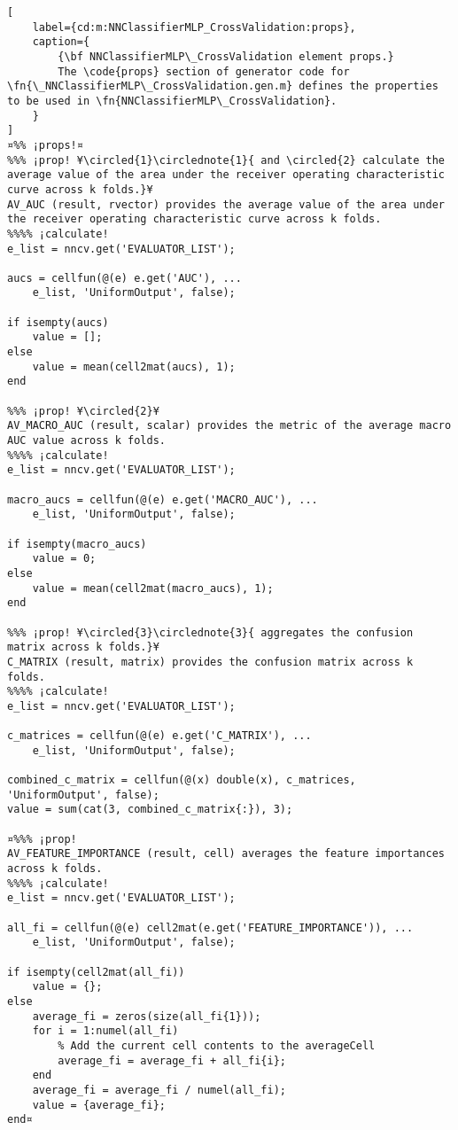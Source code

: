 \documentclass{tufte-handout}
\begin{document}
\begin{lstlisting}[
	label={cd:m:NNClassifierMLP_CrossValidation:props},
	caption={
		{\bf NNClassifierMLP\_CrossValidation element props.}
		The \code{props} section of generator code for \fn{\_NNClassifierMLP\_CrossValidation.gen.m} defines the properties to be used in \fn{NNClassifierMLP\_CrossValidation}.
	}
]
¤%% ¡props!¤
%%% ¡prop! ¥\circled{1}\circlednote{1}{ and \circled{2} calculate the average value of the area under the receiver operating characteristic curve across k folds.}¥
AV_AUC (result, rvector) provides the average value of the area under the receiver operating characteristic curve across k folds.
%%%% ¡calculate!
e_list = nncv.get('EVALUATOR_LIST');

aucs = cellfun(@(e) e.get('AUC'), ...
    e_list, 'UniformOutput', false);

if isempty(aucs)
    value = [];
else
    value = mean(cell2mat(aucs), 1);
end

%%% ¡prop! ¥\circled{2}¥
AV_MACRO_AUC (result, scalar) provides the metric of the average macro AUC value across k folds.
%%%% ¡calculate!
e_list = nncv.get('EVALUATOR_LIST');

macro_aucs = cellfun(@(e) e.get('MACRO_AUC'), ...
    e_list, 'UniformOutput', false);

if isempty(macro_aucs)
    value = 0;
else
    value = mean(cell2mat(macro_aucs), 1);
end

%%% ¡prop! ¥\circled{3}\circlednote{3}{ aggregates the confusion matrix across k folds.}¥
C_MATRIX (result, matrix) provides the confusion matrix across k folds.
%%%% ¡calculate!
e_list = nncv.get('EVALUATOR_LIST');

c_matrices = cellfun(@(e) e.get('C_MATRIX'), ...
    e_list, 'UniformOutput', false);

combined_c_matrix = cellfun(@(x) double(x), c_matrices, 'UniformOutput', false);
value = sum(cat(3, combined_c_matrix{:}), 3);

¤%%% ¡prop!
AV_FEATURE_IMPORTANCE (result, cell) averages the feature importances across k folds.
%%%% ¡calculate!
e_list = nncv.get('EVALUATOR_LIST');

all_fi = cellfun(@(e) cell2mat(e.get('FEATURE_IMPORTANCE')), ...
    e_list, 'UniformOutput', false);

if isempty(cell2mat(all_fi))
    value = {};
else
    average_fi = zeros(size(all_fi{1}));
    for i = 1:numel(all_fi)
        % Add the current cell contents to the averageCell
        average_fi = average_fi + all_fi{i};
    end
    average_fi = average_fi / numel(all_fi);
    value = {average_fi};
end¤
\end{lstlisting}
\end{document}
